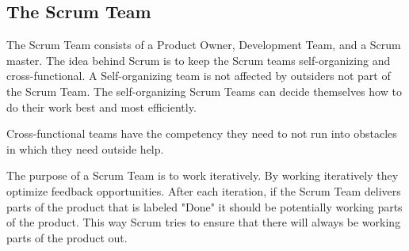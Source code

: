 \subsection{The Scrum Team}


The Scrum Team consists of a Product Owner, Development Team, and a Scrum
master\cite{scrumguide11}. The idea behind Scrum is to keep the Scrum teams self-organizing
and cross-functional. A Self-organizing team is not affected by outsiders not part of the
Scrum Team\cite{scrumguide11}. The self-organizing Scrum Teams can decide themselves how to
do their work best and most efficiently\cite{scrumguide11}. 

Cross-functional teams have the competency they need to not run into obstacles in which they
need outside help\cite{scrumguide11}.


The purpose of a Scrum Team is to work iteratively\cite{scrumguide11}. By working
iteratively they optimize feedback opportunities\cite{scrumguide11}. After each iteration,
if the Scrum Team delivers parts of the product that is labeled "Done" it should be
potentially working parts of the product\cite{scrumguide11}. This way Scrum tries to ensure
that there will always be working parts of the product out\cite{scrumguide11}.




